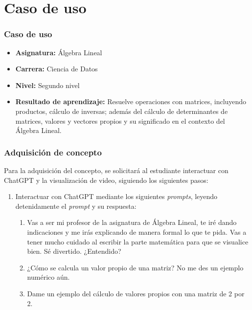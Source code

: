 \section{Caso de uso}

\begin{frame}
    \frametitle{Caso de uso}

    \begin{itemize}
        \item \textbf{Asignatura:} Álgebra Lineal
        \item \textbf{Carrera:} Ciencia de Datos
        \item \textbf{Nivel:} Segundo nivel
        \item \textbf{Resultado de aprendizaje:} Resuelve operaciones con matrices, incluyendo productos, cálculo de inversas; además del  cálculo de determinantes de matrices, valores y vectores propios y su significado en el contexto del Álgebra Lineal.
    \end{itemize}
\end{frame}

\begin{frame}
\centering
\end{frame}

\begin{frame}
    \frametitle{Adquisición de concepto}

    \small

    Para la adquisición del concepto, se solicitará al estudiante interactuar con ChatGPT y la visualización de video, siguiendo los siguientes pasos:

\begin{enumerate}[leftmargin=*,label=\arabic*.]
    \item Interactuar con ChatGPT mediante los siguientes \textit{prompts}, leyendo detenidamente el \textit{prompt} y su respuesta:
    \begin{enumerate}[label=\textit{Prompt \arabic*.},leftmargin=2.1cm]
        \item Vas a ser mi profesor de la asignatura de Álgebra Lineal, te iré dando indicaciones y me irás explicando de manera formal lo que te pida. Vas a tener mucho cuidado al escribir la parte matemática para que se visualice bien. Sé divertido. ¿Entendido?
        \item ¿Cómo se calcula un valor propio de una matriz? No me des un ejemplo numérico aún.
        \item Dame un ejemplo del cálculo de valores propios con una matriz de 2 por 2.
    \end{enumerate}
\end{enumerate}
\end{frame}

